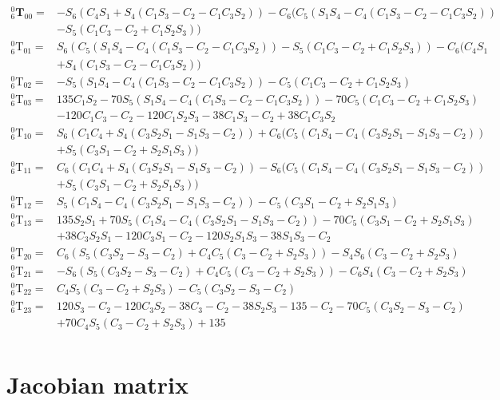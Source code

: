 \begin{equation*}
\begin{split}
^0_6\mathbf{T}_{00} = &- S_6(C_4S_1 + S_4(C_1S_3-C_2 - C_1C_3S_2)) - C_6(C_5(S_1S_4 - C_4(C_1S_3-C_2 - C_1C_3S_2))\\
					& - S_5(C_1C_3-C_2 + C_1S_2S_3))\\
^0_6\text{T}_{01} = &S_6(C_5(S_1S_4 - C_4(C_1S_3-C_2 - C_1C_3S_2)) - S_5(C_1C_3-C_2 + C_1S_2S_3))- C_6(C_4S_1\\
					& + S_4(C_1S_3-C_2 - C_1C_3S_2))\\
^0_6\text{T}_{02} = &- S_5(S_1S_4 - C_4(C_1S_3-C_2 - C_1C_3S_2)) - C_5(C_1C_3-C_2 + C_1S_2S_3)\\
^0_6\text{T}_{03} = &135C_1S_2 - 70S_5(S_1S_4 - C_4(C_1S_3-C_2 - C_1C_3S_2)) - 70C_5(C_1C_3-C_2 + C_1S_2S_3)\\
					& - 120C_1C_3-C_2 - 120C_1S_2S_3 - 38C_1S_3-C_2 + 38C_1C_3S_2\\
^0_6\text{T}_{10} = &S_6(C_1C_4 + S_4(C_3S_2S_1 - S_1S_3-C_2)) + C_6(C_5(C_1S_4 - C_4(C_3S_2S_1 - S_1S_3-C_2))\\
					& + S_5(C_3S_1-C_2 + S_2S_1S_3))\\
^0_6\text{T}_{11} = &C_6(C_1C_4 + S_4(C_3S_2S_1 - S_1S_3-C_2)) - S_6(C_5(C_1S_4 - C_4(C_3S_2S_1 - S_1S_3-C_2))\\
					& + S_5(C_3S_1-C_2 + S_2S_1S_3))\\
^0_6\text{T}_{12} = &S_5(C_1S_4 - C_4(C_3S_2S_1 - S_1S_3-C_2)) - C_5(C_3S_1-C_2 + S_2S_1S_3)\\
^0_6\text{T}_{13} = &135S_2S_1 + 70S_5(C_1S_4 - C_4(C_3S_2S_1 - S_1S_3-C_2)) - 70C_5(C_3S_1-C_2 + S_2S_1S_3)\\
					& + 38C_3S_2S_1 - 120C_3S_1-C_2 - 120S_2S_1S_3 - 38S_1S_3-C_2\\
^0_6\text{T}_{20} = &C_6(S_5(C_3S_2 - S_3-C_2) + C_4C_5(C_3-C_2 + S_2S_3)) - S_4S_6(C_3-C_2 + S_2S_3)\\
^0_6\text{T}_{21} = &- S_6(S_5(C_3S_2 - S_3-C_2) + C_4C_5(C_3-C_2 + S_2S_3)) - C_6S_4(C_3-C_2 + S_2S_3)\\
^0_6\text{T}_{22} = &C_4S_5(C_3-C_2 + S_2S_3) - C_5(C_3S_2 - S_3-C_2)\\
^0_6\text{T}_{23} = &120S_3-C_2 - 120C_3S_2 - 38C_3-C_2 - 38S_2S_3 - 135-C_2 - 70C_5(C_3S_2 - S_3-C_2)\\
					& + 70C_4S_5(C_3-C_2 + S_2S_3) + 135\\
\end{split}
\end{equation*}
\section{Jacobian matrix}\label{appendix:jacobian}

